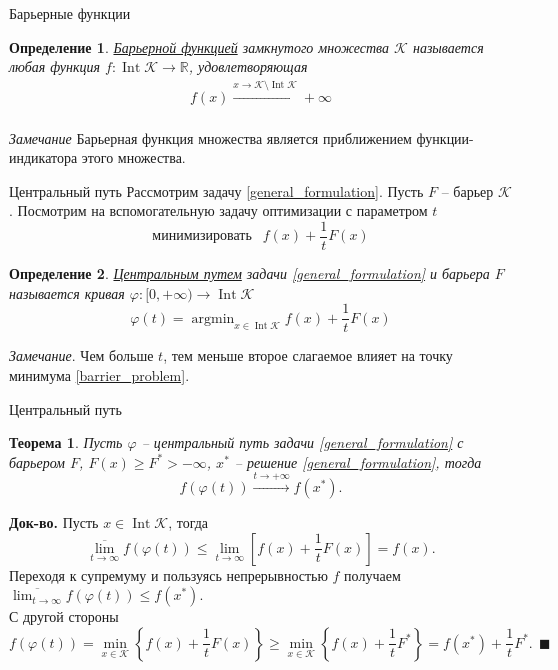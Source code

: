 \documentclass[10pt, handout]{beamer}
\DeclareMathOperator{\argmin}{argmin}
\DeclareMathOperator{\interior}{Int}
\newcounter{thm}
\newcounter{def}
\newtheorem{theorem_ru}[thm]{Теорема}
\newtheorem{definition_ru}{Определение}[def]
\begin{document}
\begin{frame}{Барьерные функции}
\begin{definition_ru}
\underline{Барьерной функцией} замкнутого множества $\mathcal{K}$ называется любая функция $f:\interior\mathcal{K}\rightarrow \mathbb{R}$, удовлетворяющая
\begin{align*}
f(x)\xrightarrow{x\rightarrow \mathcal{K}\setminus \interior \mathcal{K}}+\infty \\
\end{align*}
\end{definition_ru}
\pause
\textit{Замечание} Барьерная функция множества является приближением функции-индикатора этого множества.
\end{frame}

\begin{frame}{Центральный путь}
Рассмотрим задачу \eqref{general_formulation}. Пусть $F$ -- барьер $\mathcal{K}$. Посмотрим на вспомогательную задачу оптимизации с параметром $t$
\begin{equation}\label{barrier_problem}
\mbox{минимизировать } ~~ f(x)+\frac{1}{t}F(x)
\end{equation}
\pause
\begin{definition_ru}
\underline{Центральным путем} задачи \eqref{general_formulation} и барьера $F$ называется кривая $\varphi:[0, +\infty)\rightarrow\interior\mathcal{K}$
$$
\varphi(t)=\argmin_{x\in\interior\mathcal{K}}f(x)+\frac{1}{t}F(x)
$$
\end{definition_ru}
\pause
\textit{Замечание}. Чем больше $t$, тем меньше второе слагаемое влияет на точку минимума \eqref{barrier_problem}.
\end{frame}

\begin{frame}{Центральный путь}
\begin{theorem_ru}
Пусть $\varphi$ -- центральный путь задачи \eqref{general_formulation} с барьером $F$, $F(x)\geq F^*>-\infty$, $x^*$ -- решение \eqref{general_formulation}, тогда
$$
f(\varphi(t))\xrightarrow{t\rightarrow +\infty}f(x^*).
$$
\end{theorem_ru}
\pause
\textbf{Док-во.} Пусть $x\in \interior\mathcal{K}$, тогда
$$
\overline{\lim_{t\rightarrow\infty}}f(\varphi(t))\leq \lim_{t\rightarrow\infty}\left[f(x)+\frac{1}{t}F(x)\right]=f(x).
$$
Переходя к супремуму и пользуясь непрерывностью $f$ получаем $\overline{\lim_{t\rightarrow\infty}}f(\varphi(t))\leq f(x^*)$.\\
\pause
С другой стороны
$$
f(\varphi(t))=\min_{x\in\mathcal{K}}\left\{f(x)+\frac{1}{t}F(x)\right\}\geq\min_{x\in\mathcal{K}}\left\{f(x)+\frac{1}{t}F^*\right\}=f(x^*)+\frac{1}{t}F^*.~~\blacksquare
$$

\end{frame}
\end{document}
